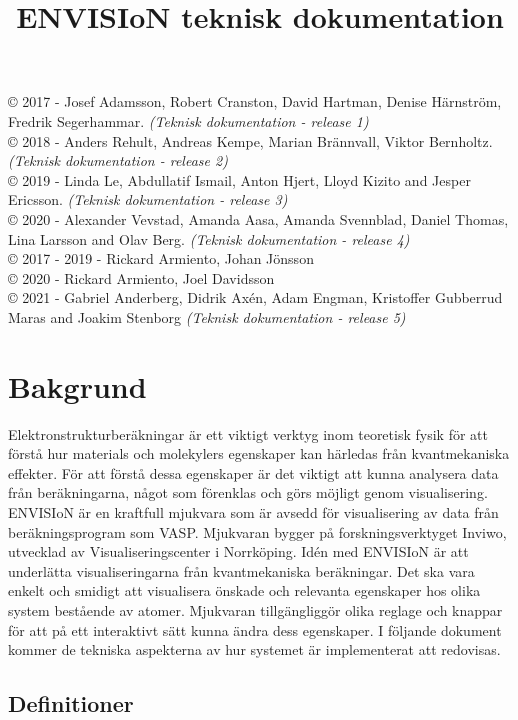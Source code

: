 \documentclass[10pt,oneside,swedish]{article}
\title{ENVISIoN teknisk dokumentation}
\date{}
\begin{document}
\maketitle

© 2017 - Josef Adamsson, Robert Cranston, David Hartman, Denise
Härnström, Fredrik Segerhammar. \emph{(Teknisk dokumentation - release
1)}\\
© 2018 - Anders Rehult, Andreas Kempe, Marian Brännvall, Viktor
Bernholtz. \emph{(Teknisk dokumentation - release 2)}\\
© 2019 - Linda Le, Abdullatif Ismail, Anton Hjert, Lloyd Kizito and
Jesper Ericsson. \emph{(Teknisk dokumentation - release 3)}\\
© 2020 - Alexander Vevstad, Amanda Aasa, Amanda Svennblad, Daniel
Thomas, Lina Larsson and Olav Berg. \emph{(Teknisk dokumentation -
release 4)}\\
© 2017 - 2019 - Rickard Armiento, Johan Jönsson\\
© 2020 - Rickard Armiento, Joel Davidsson\\
© 2021 - Gabriel Anderberg, Didrik Axén, Adam Engman, Kristoffer Gubberrud Maras and Joakim Stenborg \emph{(Teknisk dokumentation - release 5)}

\newpage
\tableofcontents

\newpage
\section{Bakgrund}\label{bakgrund}

Elektronstrukturberäkningar är ett viktigt verktyg inom teoretisk fysik
för att förstå hur materials och molekylers egenskaper kan härledas från
kvantmekaniska effekter. För att förstå dessa egenskaper är det viktigt
att kunna analysera data från beräkningarna, något som förenklas och
görs möjligt genom visualisering. ENVISIoN är en kraftfull mjukvara som
är avsedd för visualisering av data från beräkningsprogram som VASP.
Mjukvaran bygger på forskningsverktyget Inviwo, utvecklad av
Visualiseringscenter i Norrköping. Idén med ENVISIoN är att underlätta
visualiseringarna från kvantmekaniska beräkningar. Det ska vara enkelt
och smidigt att visualisera önskade och relevanta egenskaper hos olika
system bestående av atomer. Mjukvaran tillgängliggör olika reglage och
knappar för att på ett interaktivt sätt kunna ändra dess egenskaper. I
följande dokument kommer de tekniska aspekterna av hur systemet är
implementerat att redovisas.

\subsection{Definitioner}\label{definitioner}
\end{document}
